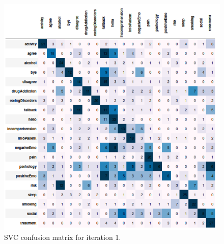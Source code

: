 \documentclass[11pt]{article}
\begin{document}
\begin{figure}[h]
	\centering
	\includegraphics[scale=0.7]{svc1_cm.png}
	\caption{SVC confusion matrix for iteration 1.}
\label{svc_cm_1}
\end{figure}
\FloatBarrier
\end{document}
